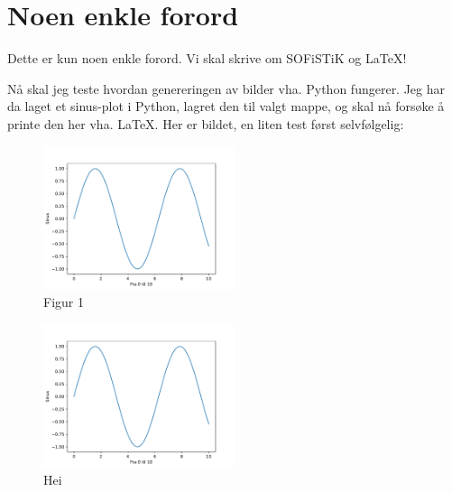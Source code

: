 \section{Noen enkle forord} \label{sec: forord}

Dette er kun noen enkle forord. 
Vi skal skrive om SOFiSTiK og \LaTeX!

Nå skal jeg teste hvordan genereringen av bilder vha. Python fungerer. Jeg har da laget et sinus-plot i Python,
lagret den til valgt mappe, og skal nå forsøke å printe den her vha. \LaTeX. Her er bildet, en liten test først selvfølgelig:

\begin{figure}[h]
    \centering
    \includegraphics[width=0.5\textwidth]{0 FIGURER/sinus}
    \caption{Figur 1}
    \label{fig:figure}
\end{figure}


\begin{figure}[h!]
    \centering
    \includegraphics[width=0.5\textwidth]{0 FIGURER/sinus.pdf}
    \caption{Hei}
    \label{fig:hei}
\end{figure} 

\vspace{2mm}